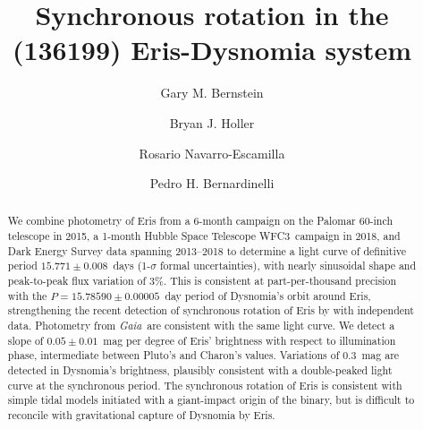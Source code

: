 \documentclass[onecolumn]{aastex631}
\newcommand{\wfc}{WFC3}
\newcommand{\gaia}{\textit{Gaia}}
\begin{document}
\title{Synchronous rotation in the (136199) Eris-Dysnomia system}

\author[0000-0002-8613-8259]{Gary M. Bernstein}

\author[0000-0002-6117-0164]{Bryan J. Holler}

\author[0009-0009-2907-5421]{Rosario Navarro-Escamilla}

\author[0000-0003-0743-9422]{Pedro H. Bernardinelli}


\suppressAffiliations

\makeatletter
\def\ps@pprintTitle{%
 \let\@oddhead\@empty
 \let\@evenhead\@empty
 \def\@oddfoot{\centerline{\thepage}}%
 \let\@evenfoot\@oddfoot}
\makeatother

\begin{abstract}
We combine photometry of Eris from a 6-month campaign on the Palomar 60-inch telescope in 2015, a 1-month Hubble Space Telescope \wfc\ campaign in 2018, and Dark Energy Survey data spanning 2013--2018 to determine a light curve of definitive period $15.771\pm 0.008$~days (1-$\sigma$ formal uncertainties), with nearly sinusoidal shape and peak-to-peak flux variation of 3\%.  This is consistent at part-per-thousand precision with the $P=15.78590\pm0.00005$~day period of Dysnomia's orbit around Eris, strengthening the recent detection of synchronous rotation of Eris by \citet{szakats} with independent data.  Photometry from \gaia\ are consistent with the same light curve.  We detect a slope of $0.05\pm0.01$~mag per degree of Eris' brightness with respect to illumination phase, intermediate between Pluto's and Charon's values.  Variations of $0.3$~mag are detected in Dysnomia's brightness, plausibly consistent with a double-peaked light curve at the synchronous period. The synchronous rotation of Eris is consistent with simple tidal models initiated with a giant-impact origin of the binary, but is difficult to reconcile with gravitational capture of Dysnomia by Eris.
\end{abstract}
\end{document}
